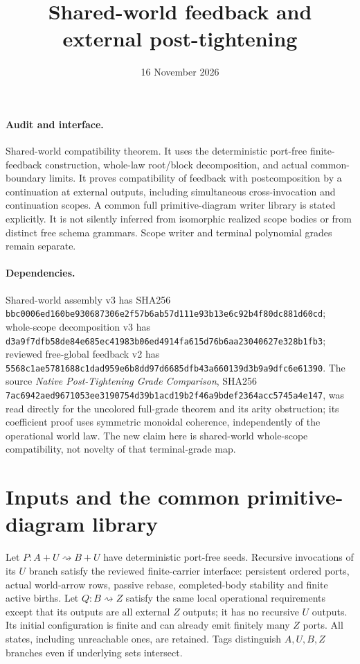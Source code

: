 \documentclass[11pt]{article}
\title{Shared-world feedback and external post-tightening}
\date{16 November 2026}
\begin{document}
\maketitle
\paragraph{Audit and interface.} Shared-world compatibility theorem. It uses the deterministic port-free finite-feedback construction, whole-law root/block decomposition, and actual common-boundary limits. It proves compatibility of feedback with postcomposition by a continuation at external outputs, including simultaneous cross-invocation and continuation scopes. A common full primitive-diagram writer library is stated explicitly. It is not silently inferred from isomorphic realized scope bodies or from distinct free schema grammars. Scope writer and terminal polynomial grades remain separate.

\paragraph{Dependencies.} Shared-world assembly v3 has SHA256 \texttt{bbc0006ed160be930687306e2f57b6ab57d111e93b13e6c92b4f80dc881d60cd}; whole-scope decomposition v3 has \texttt{d3a9f7dfb58de84e685ec41983b06ed4914fa615d76b6aa23040627e328b1fb3}; reviewed free-global feedback v2 has \texttt{5568c1ae5781688c1dad959e6b8dd97d6685dfb43a660139d3b9a9dfc6e61390}. The source \emph{Native Post-Tightening Grade Comparison}, SHA256 \texttt{7ac6942aed9671053ee3190754d39b1acd19b2f46a9bdef2364acc5745a4e147}, was read directly for the uncolored full-grade theorem and its arity obstruction; its coefficient proof uses symmetric monoidal coherence, independently of the operational world law. The new claim here is shared-world whole-scope compatibility, not novelty of that terminal-grade map.

\section{Inputs and the common primitive-diagram library}
Let $P:A+U\rightsquigarrow B+U$ have deterministic port-free seeds. Recursive invocations of its $U$ branch satisfy the reviewed finite-carrier interface: persistent ordered ports, actual world-arrow rows, passive rebase, completed-body stability and finite active births. Let $Q:B\rightsquigarrow Z$ satisfy the same local operational requirements except that its outputs are all external $Z$ outputs; it has no recursive $U$ outputs. Its initial configuration is finite and can already emit finitely many $Z$ ports. All states, including unreachable ones, are retained. Tags distinguish $A,U,B,Z$ branches even if underlying sets intersect.
\end{document}
